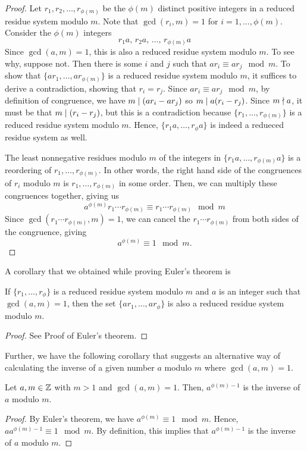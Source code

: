 \begin{proof}
    Let $r_1,r_2,\ldots,r_{\phi(m)}$ be the $\phi(m)$ distinct positive integers in a reduced residue system modulo $m$. Note that $\gcd(r_i, m) = 1$ for $i = 1,\ldots,\phi(m)$. Consider the $\phi(m)$ integers
    $$
    r_1a, \,r_2a,\,\ldots,\,r_{\phi(m)}a
    $$
    Since $\gcd(a,m) = 1$, this is also a reduced residue system modulo $m$. To see why, suppose not. Then there is some $i$ and $j$ such that $ar_i \equiv ar_j \mod m$. To show that $\{ar_1,\ldots,ar_{\phi(m)}\}$ is a reduced residue system modulo $m$, it suffices to derive a contradiction, showing that $r_i = r_j$. Since $ar_i \equiv ar_j \mod m$, by definition of congruence, we have $m \mathrel{\mid} (ar_i - ar_j)$ so $m \mathrel{\mid} a(r_i - r_j)$. Since $m \mathrel{\nmid} a$, it must be that $m \mathrel{\mid} (r_i - r_j)$, but this is a contradiction because $\{r_1,\ldots,r_{\phi(m)}\}$ is a reduced residue system modulo $m$. Hence, $\{r_1a,\ldots,r_{\phi}a\}$ is indeed a redueced residue system as well.

    The least nonnegative residues modulo $m$ of the integers in $\{r_1a,\ldots,r_{\phi(m)}a\}$ is a reordering of $r_1,\ldots,r_{\phi(m)}$. In other words, the right hand side of the congruences of $r_i$ modulo $m$ is $r_1,\ldots,r_{\phi(m)}$ in some order. Then, we can multiply these congruences together, giving us
    $$
    a^{\phi(m)} r_1 \cdots r_{\phi(m)} \equiv r_1 \cdots r_{\phi(m)} \mod m
    $$
    Since $\gcd(r_1\cdots r_{\phi(m)},m) = 1$, we can cancel the $r_1\cdots r_{\phi(m)}$ from both sides of the congruence, giving
    $$
    a^{\phi(m)} \equiv 1 \mod m.
    $$ 
\end{proof}

A corollary that we obtained while proving Euler's theorem is
\begin{corollary}
    If $\{r_1,\ldots,r_{\phi}\}$ is a reduced residue system modulo $m$ and $a$ is an integer such that $\gcd(a,m) = 1$, then the set $\{ar_1,\ldots,ar_{\phi}\}$ is also a reduced residue system modulo $m$.
\end{corollary}

\begin{proof}
    See Proof of Euler's theorem.
\end{proof}

Further, we have the following corollary that suggests an alternative way of calculating the inverse of a given number $a$ modulo $m$ where $\gcd(a,m) = 1$.

\begin{corollary}
    Let $a,m \in \mathbb{Z}$ with $m > 1$ and $\gcd(a,m) = 1$. Then, $a^{\phi(m)-1}$ is the inverse of $a$ modulo $m$. 
\end{corollary}

\begin{proof}
    By Euler's theorem, we have $a^{\phi(m)} \equiv 1 \mod m$. Hence, $aa^{\phi(m)-1} \equiv 1 \mod m$. By definition, this implies that $a^{\phi(m)-1}$ is the inverse of $a$ modulo $m$.
\end{proof}